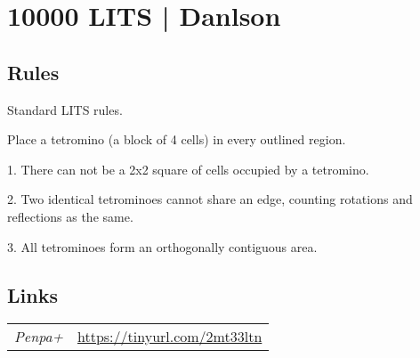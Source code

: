 \section{10000 LITS | {\normalfont Danlson}}
\label{sec:09-10000-lits-danlson}

\subsection*{Rules}
\begin{markdown}
Standard LITS rules.

Place a tetromino (a block of 4 cells) in every outlined region.

1. There can not be a 2x2 square of cells occupied by a tetromino.

2. Two identical tetrominoes cannot share an edge, counting rotations and reflections as the same.

3. All tetrominoes form an orthogonally contiguous area.
\end{markdown}
\subsection*{Links}
\begin{tabularx}{\textwidth}{l X}
\emph{Penpa+} & \url{https://tinyurl.com/2mt33ltn} \\
\end{tabularx}
\pagebreak
